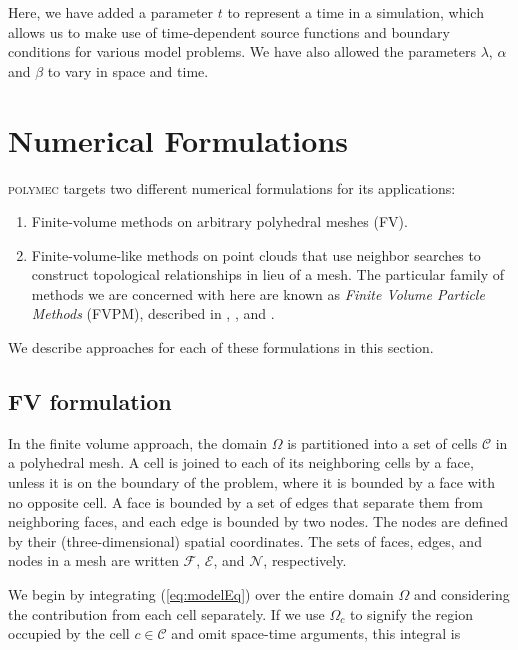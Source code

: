 \documentclass[12pt]{article}
\newcommand{\labelSec}[1]{\label{sec:#1}}
\newcommand{\refEq}[1]{(\ref{eq:#1})}
\newcommand{\polymec}{\textsc{polymec} }
\begin{document}
\noindent
Here, we have added a parameter $t$ to represent a time in a simulation, which allows us to 
make use of time-dependent source functions and boundary conditions for various model problems. 
We have also allowed the parameters $\lambda$, $\alpha$ and $\beta$ to vary in space and time.

\section{Numerical Formulations}\labelSec{Numerics}

\polymec targets two different numerical formulations for its applications:

\begin{enumerate}
 \item Finite-volume methods on arbitrary polyhedral meshes (FV).
 \item Finite-volume-like methods on point clouds that use neighbor searches 
       to construct topological relationships in lieu of a mesh. The particular 
       family of methods we are concerned with here are known as {\em Finite Volume Particle Methods} (FVPM), 
       described in \cite{Hietel2000}, \cite{Teleaga2005}, and \cite{Nestor2009}.
\end{enumerate}

\noindent
We describe approaches for each of these formulations in this section.

\subsection{FV formulation}

In the finite volume approach, the domain $\Omega$ is partitioned into a set of 
cells $\mathcal{C}$ in a polyhedral mesh. A cell is joined to each of its neighboring 
cells by a face, unless it is on the boundary of the problem, where it is bounded by 
a face with no opposite cell. A face is bounded by a set of edges that separate them 
from neighboring faces, and each edge is bounded by two nodes. The nodes are defined
by their (three-dimensional) spatial coordinates. The sets of faces, edges, and nodes in 
a mesh are written $\mathcal{F}$, $\mathcal{E}$, and $\mathcal{N}$, respectively.

We begin by integrating \refEq{modelEq} over the entire domain $\Omega$ and 
considering the contribution from each cell separately. If we use $\Omega_c$ to signify
the region occupied by the cell $c \in \mathcal{C}$ and omit space-time arguments, this integral is 
\end{document}
